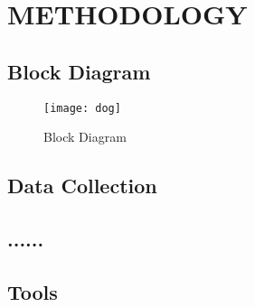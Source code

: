 \chapter{METHODOLOGY}
\section{Block Diagram }

\begin{figure}[ht]
\centering
\texttt{[image: dog]}
\caption{Block Diagram}
\end{figure}

\section{Data Collection}
\section{......}
\section{Tools}


